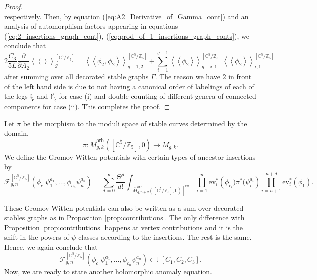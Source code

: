 \documentclass[12pt]{amsart}
\numberwithin{equation}{section}
\begin{document}
\begin{proof}
\begin{equation*}
\end{equation*}
respectively. Then, by equation (\ref{eq:A2_Derivative_of_Gamma_cont}) and an analysis of automorphism factors appearing in equations (\ref{eq:2_insertions_graph_cont}), (\ref{eq:prod_of_1_insertions_graph_conts}), we conclude that
\begin{equation*}
2\frac{C_{3}}{5L}\frac{\partial}{\partial A_2}\left\langle\left\langle\right\rangle\right\rangle_{g}^{\left[\mathbb{C}^5 / \mathbb{Z}_5\right]}
=\left\langle\left\langle\phi_{2},\phi_{2}\right\rangle\right\rangle_{g-1,2}^{\left[\mathbb{C}^5 / \mathbb{Z}_5\right]}+\sum_{i=1}^{g-1}\left\langle\left\langle\phi_{2}\right\rangle\right\rangle_{g-i,1}^{\left[\mathbb{C}^5 / \mathbb{Z}_5\right]}\left\langle\left\langle\phi_{2}\right\rangle\right\rangle_{i,1}^{\left[\mathbb{C}^5 / \mathbb{Z}_5\right]}
\end{equation*}
after summing over all decorated stable graphs $\Gamma$. The reason we have $2$ in front of the left hand side is due to not having a canonical order of labelings of each of the legs $\mathfrak{l}_{\tilde{\mathfrak{e}}}$ and $\mathfrak{l}'_{\tilde{\mathfrak{e}}}$ for case (i) and double counting  of different genera of connected components for case (ii). This completes the proof. 
\end{proof}

Let $\pi$ be the morphism to the moduli space of stable curves determined by the domain, $$\pi:\overline{M}_{g, k}^{\mathrm{orb}}\left(\left[\mathbb{C}^{5} / \mathbb{Z}_{5}\right], 0\right)\rightarrow \overline{M}_{g, k}.$$
We define the Gromov-Witten potentials with certain types of ancestor insertions by
\begin{equation*}
\mathcal{F}_{g, n}^{\left[\mathbb{C}^{5} / \mathbb{Z}_{5}\right]}\left(\phi_{c_{1}}\psi_1^{a_1}, \ldots, \phi_{c_{n}}\psi_n^{a_n}\right)=\sum_{d=0}^{\infty} \frac{\Theta^{d}}{d !} \int_{\left[\overline{M}_{g, n+d}^{\mathrm{orb}}\left(\left[\mathbb{C}^{5} / \mathbb{Z}_{5}\right], 0\right)\right]^{v i r}} \prod_{i=1}^{n} \mathrm{ev}_{i}^{*}\left(\phi_{c_{i}})\pi^{*}(\psi_i^{a_i}\right) \prod_{i=n+1}^{n+d} \mathrm{ev}_{i}^{*}\left(\phi_{1}\right).
\end{equation*}

These Gromov-Witten potentials can also be written as a sum over decorated stables graphs as in Proposition \ref{prop:contributions}. The only difference with Proposition \ref{prop:contributions} happens at vertex contributions and it is the shift in the powers of $\psi$ classes according to the insertions. The rest is the same. Hence, we again conclude that
$$\mathcal{F}_{g, n}^{\left[\mathbb{C}^{5} / \mathbb{Z}_{5}\right]}\left(\phi_{c_{1}}\psi_1^{a_1}, \ldots, \phi_{c_{n}}\psi_n^{a_n}\right)\in\mathbb{F}[C_1,C_2,C_3].$$
Now, we are ready to state another holomorphic anomaly equation.
\end{document}

